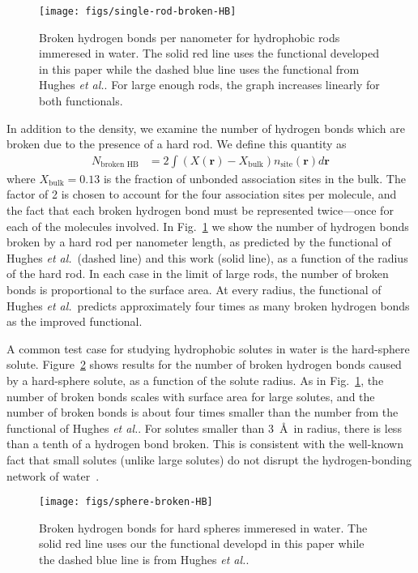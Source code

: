 \documentclass[preprint, endfloats,amsmath,amssymb,jcp]{revtex4-1}
\newcommand{\rr}{\textbf{r}}
\newcommand\hughesetal{Hughes \emph{et al.}}
\begin{document}
\begin{figure}
\begin{center}
\texttt{[image: figs/single-rod-broken-HB]}
\end{center}
\caption{Broken hydrogen bonds per nanometer for hydrophobic rods
  immeresed in water.  The solid red line uses the functional developed
  in this paper while the dashed blue line uses the functional from
  \hughesetal. For large enough rods, the graph
  increases linearly for both functionals.}
\label{fig:single-rod-broken-HB}
\end{figure}

In addition to the density, we examine the number of hydrogen bonds
which are broken due to the presence of a hard rod.  We define this
quantity as
\begin{align}
  N_{\text{broken HB}} &= 2 \int (X(\rr) - X_{\text{bulk}})n_{\text{site}}(\rr) d\rr
\end{align}
where $X_{\text{bulk}} = 0.13$ is the fraction of unbonded
association sites in the bulk.  The factor of 2 is chosen to account
for the four association sites per molecule, and the fact that each
broken hydrogen bond must be represented twice---once for each of the
molecules involved.  In Fig.~\ref{fig:single-rod-broken-HB} we show
the number of hydrogen bonds broken by a hard rod per nanometer
length, as predicted by the functional of \hughesetal\ (dashed line)
and this work (solid line), as a function of the radius of the hard
rod.  In each case in the limit of large rods, the number of broken
bonds is proportional to the surface area.  At every radius, the
functional of \hughesetal\ predicts approximately four times as many
broken hydrogen bonds as the improved functional.

A common test case for studying hydrophobic solutes in water is the
hard-sphere solute.  Figure~\ref{fig:spheres-broken-HB} shows results
for the number of broken hydrogen bonds caused by a hard-sphere solute,
as a function of the solute radius.  As in
Fig.~\ref{fig:single-rod-broken-HB}, the number of broken bonds scales
with surface area for large solutes, and the number of broken bonds is
about four times smaller than the number from the functional of
\hughesetal.  For solutes smaller than
3~\AA\ in radius, there is less than a tenth of a hydrogen bond
broken. This is consistent with the well-known fact that small solutes
(unlike large solutes) do not disrupt the hydrogen-bonding network of
water~\cite{chandler2005}.

\begin{figure}
\begin{center}
\texttt{[image: figs/sphere-broken-HB]}
\end{center}
\caption{Broken hydrogen bonds for hard spheres immeresed in water.
  The solid red line uses our the functional developd in this paper
  while the dashed blue line is from
  \hughesetal.}
\label{fig:spheres-broken-HB}
\end{figure}
\end{document}
